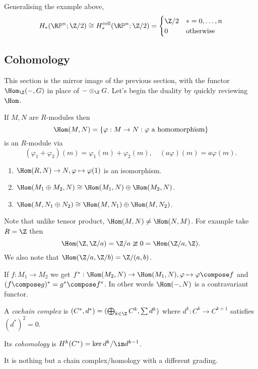 \documentclass[a4paper]{article}
\renewcommand*{\P}{\mathbb{P}}
\newcommand{\cell}{\mathrm{cell}}
\begin{document}
\begin{eg}
  Generalising the example above,
  \[
    H_*(\R\P^n; \Z/2) \cong H_*^\cell(\R\P^n; \Z/2) =
    \begin{cases}
      \Z/2 & * = 0, \dots, n \\
      0 & \text{otherwise}
    \end{cases}
  \]
\end{eg}

\subsection{Cohomology}

This section is the mirror image of the previous section, with the functor \(\Hom_\Z(-, G)\) in place of \(- \otimes_\Z G\). Let's begin the duality by quickly reviewing \(\Hom\).

If \(M, N\) are \(R\)-modules then
\[
  \Hom(M, N) = \{\varphi: M \to N: \varphi \text{ a homomorphism}\}
\]
is an \(R\)-module via
\[
  (\varphi_1 + \varphi_2)(m) = \varphi_1(m) + \varphi_2(m), \quad (a \varphi)(m) = a \varphi(m).
\]

\begin{proposition}\leavevmode
  \begin{enumerate}
  \item \(\Hom(R, N) \to N, \varphi \mapsto \varphi(1)\) is an isomorphism.
  \item \(\Hom(M_1 \oplus M_2, N) \cong \Hom(M_1, N) \oplus \Hom(M_2, N)\).
  \item \(\Hom(M, N_1 \oplus N_2) \cong \Hom(M, N_1) \oplus \Hom(M, N_2)\).
  \end{enumerate}
\end{proposition}

Note that unlike tensor product, \(\Hom(M, N) \neq \Hom(N, M)\). For example take \(R = \Z\) then
\[
  \Hom(\Z, \Z/a) = \Z/a \ncong 0 = \Hom(\Z/a, \Z).
\]
We also note that \(\Hom(\Z/a, \Z/b) = \Z/(a, b)\).

If \(f: M_1 \to M_2\) we get \(f^*: \Hom(M_2, N) \to \Hom(M_1, N), \varphi \mapsto \varphi \compose f\) and \((f \compose g)^* = g^* \compose f^*\). In other words \(\Hom(-, N)\) is a contravariant functor.

\begin{definition}
  A \emph{cochain complex} is \((C^*, d^*) = (\bigoplus_{k \in \Z} C^k, \sum d^k)\)  where \(d^k: C^k \to C^{k + 1}\) satisfies \((d^*)^2 = 0\).

  Its \emph{cohomology} is \(H^k(C^*) = \ker d^k/\im d^{k - 1}\).
\end{definition}
It is nothing but a chain complex/homology with a different grading.
\end{document}
